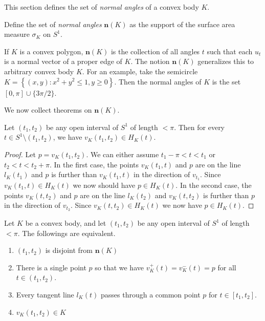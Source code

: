 This section defines the set of \emph{normal angles} of a convex body \(K\).

\begin{definition}

Define the set of \emph{normal angles} \(\mathbf{n}(K)\) as the support of the surface area measure \(\sigma_K\) on \(S^1\).

\label{def:convex-set-support}
\end{definition}

If \(K\) is a convex polygon, \(\mathbf{n}(K)\) is the collection of all angles \(t\) such that each \(u_t\) is a normal vector of a proper edge of \(K\). The notion \(\mathbf{n}(K)\) generalizes this to arbitrary convex body \(K\). For an example, take the semicircle \(K = \left\{ (x, y) : x^2 + y^2 \leq 1, y \geq 0 \right\}\). Then the normal angles of \(K\) is the set \([0, \pi] \cup \{3\pi/2\}\).

We now collect theorems on \(\mathbf{n}(K)\).

\begin{lemma}

Let \((t_1, t_2)\) be any open interval of \(S^1\) of length \(< \pi\). Then for every \(t \in S^1 \setminus (t_1, t_2)\), we have \(v_K(t_1, t_2) \in H_K(t)\).

\label{lem:vertex-in-half-plane}
\end{lemma}

\begin{proof}
Let \(p = v_K(t_1, t_2)\). We can either assume \(t_1 - \pi < t < t_1\) or \(t_2 < t < t_2 + \pi\). In the first case, the points \(v_K(t_1, t)\) and \(p\) are on the line \(l_K(t_1)\) and \(p\) is further than \(v_K(t_1, t)\) in the direction of \(v_{t_1}\). Since \(v_K(t_1, t) \in H_K(t)\) we now should have \(p \in H_K(t)\). In the second case, the points \(v_K(t, t_2)\) and \(p\) are on the line \(l_K(t_2)\) and \(v_K(t, t_2)\) is further than \(p\) in the direction of \(v_{t_2}\). Since \(v_K(t, t_2) \in H_K(t)\) we now have \(p \in H_K(t)\).
\end{proof}

\begin{theorem}

Let \(K\) be a convex body, and let \((t_1, t_2)\) be any open interval of \(S^1\) of length \(< \pi\). The followings are equivalent.

\begin{enumerate}
\def\labelenumi{\arabic{enumi}.}
\tightlist
\item
  \((t_1, t_2)\) is disjoint from \(\mathbf{n}(K)\)
\item
  There is a single point \(p\) so that we have \(v_K^+(t) = v_K^-(t) = p\) for all \(t \in (t_1, t_2)\).
\item
  Every tangent line \(l_K(t)\) passes through a common point \(p\) for \(t \in [t_1, t_2]\).
\item
  \(v_K(t_1, t_2) \in K\)
\end{enumerate}

\label{thm:convex-set-support-disjoint}
\end{theorem}

